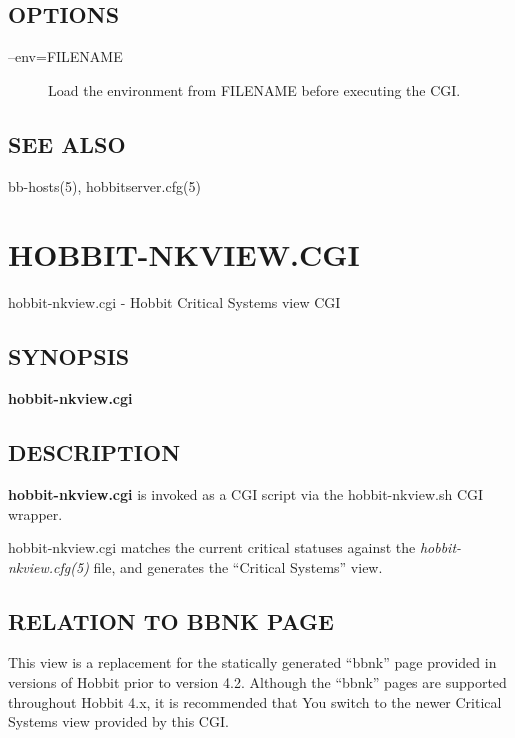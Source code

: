 \subsection{OPTIONS}
\begin{description}
\item[--env=FILENAME] Load the environment from FILENAME before executing the CGI. 

\end{description}
\subsection{SEE ALSO}
bb-hosts(5), hobbitserver.cfg(5) 

 

%
\newpage
\section{HOBBIT-NKVIEW.CGI}


 hobbit-nkview.cgi - Hobbit Critical Systems view CGI 

\subsection{SYNOPSIS}
\textbf{hobbit-nkview.cgi}


 
\subsection{DESCRIPTION}
\textbf{hobbit-nkview.cgi} is invoked as a CGI script via the hobbit-nkview.sh CGI wrapper. 

  hobbit-nkview.cgi matches the current critical statuses against the
  \emph{hobbit-nkview.cfg(5)} file, and generates the ``Critical
  Systems'' view. 



 
\subsection{RELATION TO BBNK PAGE}
 This view is a replacement for the statically generated ``bbnk'' page
 provided in versions of Hobbit prior to version 4.2. Although the
 ``bbnk'' pages are supported throughout Hobbit 4.x, it is recommended
 that You switch to the newer Critical Systems view provided by this
 CGI. 


